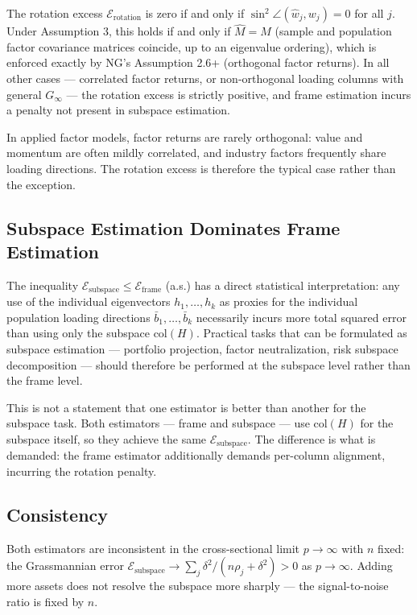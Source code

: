 \documentclass{article}
\theoremstyle{remark}
\begin{document}
The rotation excess $\mathcal{E}_{\mathrm{rotation}}$ is zero if and only if $\sin^2\angle(\hat{w}_j, w_j) = 0$ for all $j$. Under Assumption 3, this holds if and only if $\hat{M} = M$ (sample and population factor covariance matrices coincide, up to an eigenvalue ordering), which is enforced exactly by NG's Assumption 2.6+ (orthogonal factor returns). In all other cases — correlated factor returns, or non-orthogonal loading columns with general $G_\infty$ — the rotation excess is strictly positive, and frame estimation incurs a penalty not present in subspace estimation.

In applied factor models, factor returns are rarely orthogonal: value and momentum are often mildly correlated, and industry factors frequently share loading directions. The rotation excess is therefore the typical case rather than the exception.

\subsection{Subspace Estimation Dominates Frame Estimation}

The inequality $\mathcal{E}_{\mathrm{subspace}} \le \mathcal{E}_{\mathrm{frame}}$ (a.s.) has a direct statistical interpretation: any use of the individual eigenvectors $h_1, \ldots, h_k$ as proxies for the individual population loading directions $\bar{b}_1, \ldots, \bar{b}_k$ necessarily incurs more total squared error than using only the subspace $\mathrm{col}(H)$. Practical tasks that can be formulated as subspace estimation — portfolio projection, factor neutralization, risk subspace decomposition — should therefore be performed at the subspace level rather than the frame level.

This is not a statement that one estimator is better than another for the subspace task. Both estimators — frame and subspace — use $\mathrm{col}(H)$ for the subspace itself, so they achieve the same $\mathcal{E}_{\mathrm{subspace}}$. The difference is what is demanded: the frame estimator additionally demands per-column alignment, incurring the rotation penalty.

\subsection{Consistency}

Both estimators are inconsistent in the cross-sectional limit $p \to \infty$ with $n$ fixed: the Grassmannian error $\mathcal{E}_{\mathrm{subspace}} \to \sum_j \delta^2/(n\rho_j + \delta^2) > 0$ as $p \to \infty$. Adding more assets does not resolve the subspace more sharply — the signal-to-noise ratio is fixed by $n$.
\end{document}
